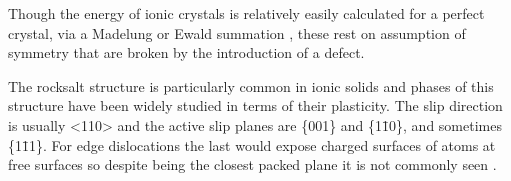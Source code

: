 Though the energy of ionic crystals is relatively easily calculated for a perfect crystal, via a Madelung or Ewald summation \cite{madelung1918,Ewald1921}, these rest on assumption of symmetry that are broken by the introduction of a defect.

The rocksalt structure is particularly common in ionic solids and phases of this structure have been widely studied in terms of their plasticity. The slip direction is usually <110> and the active slip planes are \{001\} and \{1\={1}0\}, and sometimes \{1\={1}1\}. For edge dislocations the last would expose charged surfaces of atoms at free surfaces so despite being the closest packed plane it is not commonly seen \cite{Haasen1985}.



























































